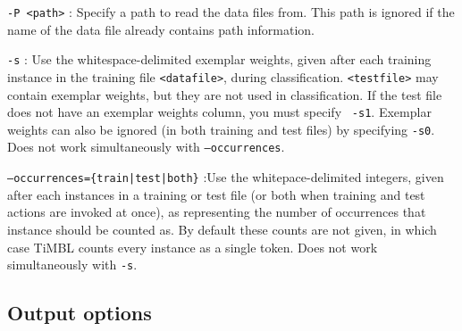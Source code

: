 \documentclass{book}
\begin{document}
\begin{description}
\item {\tt -P <path>} : Specify a path to read the data files
  from. This path is ignored if the name of the data file already
  contains path information.

\item {\tt -s} : Use the whitespace-delimited exemplar weights, given
  after each training instance in the training file {\tt <datafile>},
  during classification. {\tt <testfile>} may contain exemplar
  weights, but they are not used in classification. If the test file
  does not have an exemplar weights column, you must specify {\tt
    -s1}. Exemplar weights can also be ignored (in both training and
  test files) by specifying {\tt -s0}. Does not work simultaneously
  with {\tt --occurrences}.

\item {\tt --occurrences=\{train|test|both\}} :Use the
  whitepace-delimited integers, given after each instances in a
  training or test file (or both when training and test actions are
  invoked at once), as representing the number of occurrences that
  instance should be counted as. By default these counts are not
  given, in which case TiMBL counts every instance as a single
  token. Does not work simultaneously with {\tt -s}.
\end{description}

\subsection{Output options}
\end{document}
